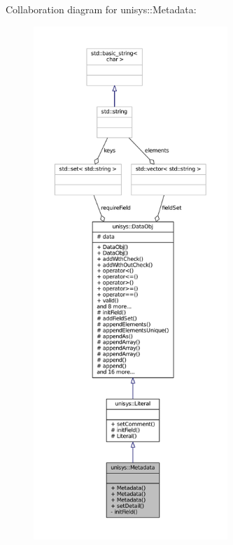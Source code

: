 Collaboration diagram for unisys\-:\-:Metadata\-:
\nopagebreak
\begin{figure}[H]
\begin{center}
\leavevmode
\includegraphics[height=550pt]{classunisys_1_1Metadata__coll__graph}
\end{center}
\end{figure}
